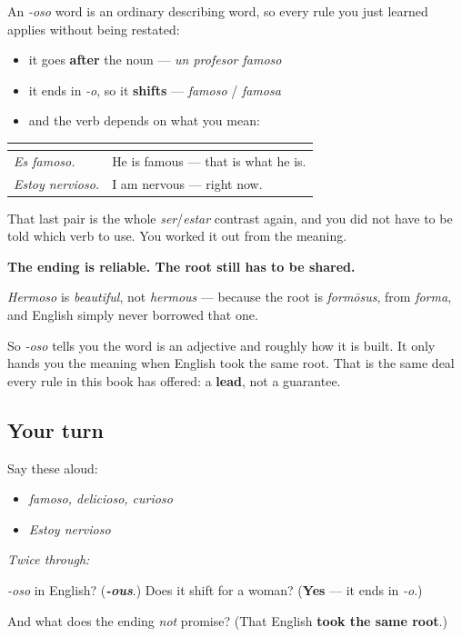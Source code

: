 \begin{grammarlens}[title={Grammar Lens: and you already know what to do with it}]
An \emph{-oso} word is an ordinary describing word, so every rule you just learned applies without being restated:

\begin{itemize}
\raggedright
  \item it goes \textbf{after} the noun — \emph{un profesor famoso}
  \item it ends in \emph{-o}, so it \textbf{shifts} — \emph{famoso} / \emph{famosa}
  \item and the verb depends on what you mean:
\end{itemize}

\noindent
\begin{tabularx}{\linewidth}{@{}>{\raggedright\arraybackslash}X>{\raggedright\arraybackslash}X@{}}
\toprule
\textbf{} & \textbf{} \\
\midrule
\emph{Es famoso.} & He is famous — that is what he is. \\
\emph{Estoy nervioso.} & I am nervous — right now. \\
\bottomrule
\end{tabularx}

That last pair is the whole \emph{ser}/\emph{estar} contrast again, and you did not have to be told which verb to use. You worked it out from the meaning.
\end{grammarlens}

\begin{culture}
\textbf{The ending is reliable. The root still has to be shared.}

\emph{Hermoso} is \emph{beautiful}, not \emph{hermous} — because the root is \emph{formōsus}, from \emph{forma}, and English simply never borrowed that one.

So \emph{-oso} tells you the word is an adjective and roughly how it is built. It only hands you the meaning when English took the same root. That is the same deal every rule in this book has offered: a \textbf{lead}, not a guarantee.
\end{culture}

\subsection*{Your turn}
Say these aloud:

\begin{itemize}
\raggedright
  \item \emph{famoso, delicioso, curioso}
  \item \emph{Estoy nervioso}
\end{itemize}

\emph{Twice through:}

\begin{tcolorbox}[breakable,colback=teal!4,colframe=teal!35!black,title={Before you move on}]
\emph{-oso} in English? (\emph{\textbf{-ous}}.) Does it shift for a woman? (\textbf{Yes} — it ends in \emph{-o}.)

And what does the ending \emph{not} promise? (That English \textbf{took the same root}.)
\end{tcolorbox}
